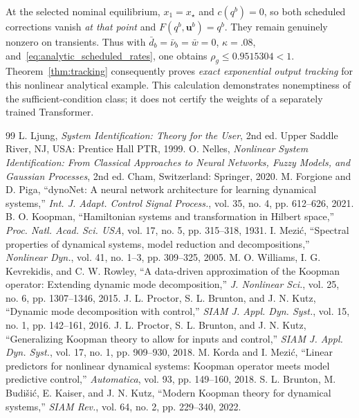 \documentclass[journal]{IEEEtran}
\theoremstyle{plain}
\theoremstyle{definition}
\newcommand{\vu}{\mathbf{u}}
\begin{document}
At the selected nominal equilibrium, $x_1=x_\star$ and $c(q^b)=0$, so both scheduled corrections vanish \emph{at that point} and $F(q^b,\vu^b)=q^b$. They remain genuinely nonzero on transients. Thus with $\bar d_b=\bar\nu_b=\bar w=0$, $\kappa=.08$, and~\eqref{eq:analytic_scheduled_rates}, one obtains $\rho_g\le0.9515304<1$. Theorem~\ref{thm:tracking} consequently proves \emph{exact exponential output tracking} for this nonlinear analytical example. This calculation demonstrates nonemptiness of the sufficient-condition class; it does not certify the weights of a separately trained Transformer.
\endgroup

\begin{thebibliography}{99}
L. Ljung, \emph{System Identification: Theory for the User}, 2nd ed. Upper Saddle River, NJ, USA: Prentice Hall PTR, 1999.
O. Nelles, \emph{Nonlinear System Identification: From Classical Approaches to Neural Networks, Fuzzy Models, and Gaussian Processes}, 2nd ed. Cham, Switzerland: Springer, 2020.
M. Forgione and D. Piga, ``dynoNet: A neural network architecture for learning dynamical systems,'' \emph{Int. J. Adapt. Control Signal Process.}, vol. 35, no. 4, pp. 612--626, 2021.
B. O. Koopman, ``Hamiltonian systems and transformation in Hilbert space,'' \emph{Proc. Natl. Acad. Sci. USA}, vol. 17, no. 5, pp. 315--318, 1931.
I. Mezi\'c, ``Spectral properties of dynamical systems, model reduction and decompositions,'' \emph{Nonlinear Dyn.}, vol. 41, no. 1--3, pp. 309--325, 2005.
M. O. Williams, I. G. Kevrekidis, and C. W. Rowley, ``A data-driven approximation of the Koopman operator: Extending dynamic mode decomposition,'' \emph{J. Nonlinear Sci.}, vol. 25, no. 6, pp. 1307--1346, 2015.
J. L. Proctor, S. L. Brunton, and J. N. Kutz, ``Dynamic mode decomposition with control,'' \emph{SIAM J. Appl. Dyn. Syst.}, vol. 15, no. 1, pp. 142--161, 2016.
J. L. Proctor, S. L. Brunton, and J. N. Kutz, ``Generalizing Koopman theory to allow for inputs and control,'' \emph{SIAM J. Appl. Dyn. Syst.}, vol. 17, no. 1, pp. 909--930, 2018.
M. Korda and I. Mezi\'c, ``Linear predictors for nonlinear dynamical systems: Koopman operator meets model predictive control,'' \emph{Automatica}, vol. 93, pp. 149--160, 2018.
S. L. Brunton, M. Budi\v{s}i\'c, E. Kaiser, and J. N. Kutz, ``Modern Koopman theory for dynamical systems,'' \emph{SIAM Rev.}, vol. 64, no. 2, pp. 229--340, 2022.

\end{thebibliography}
\end{document}

